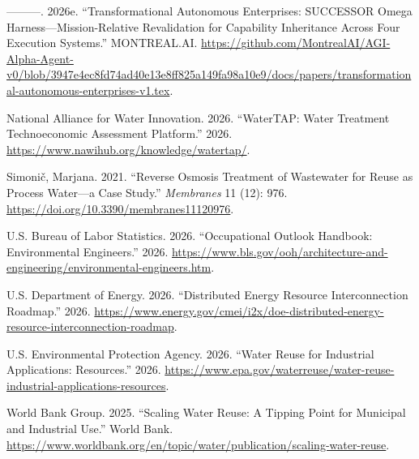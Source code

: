 \documentclass[
  11pt,
  letterpaper,
]{article}
\newlength{\cslhangindent}
\newlength{\cslentryspacingunit} %
\newenvironment{CSLReferences}[2] %
 {%
  \setlength{\parindent}{0pt}
  \ifodd #1
  \let\oldpar\par
  \def\par{\hangindent=\cslhangindent\oldpar}
  \fi
  \setlength{\parskip}{#2\cslentryspacingunit}
 }%
 {}
\begin{document}
\begin{CSLReferences}{1}{0}
\leavevmode{}%
---------. 2026e. {``Transformational Autonomous Enterprises: SUCCESSOR
Omega Harness---Mission-Relative Revalidation for Capability Inheritance
Across Four Execution Systems.''} MONTREAL.AI.
\url{https://github.com/MontrealAI/AGI-Alpha-Agent-v0/blob/3947e4ec8fd74ad40e13e8ff825a149fa98a10e9/docs/papers/transformational-autonomous-enterprises-v1.tex}.

\leavevmode{}%
National Alliance for Water Innovation. 2026. {``WaterTAP: Water
Treatment Technoeconomic Assessment Platform.''} 2026.
\url{https://www.nawihub.org/knowledge/watertap/}.

\leavevmode{}%
Simonič, Marjana. 2021. {``Reverse Osmosis Treatment of Wastewater for
Reuse as Process Water---a Case Study.''} \emph{Membranes} 11 (12): 976.
\url{https://doi.org/10.3390/membranes11120976}.

\leavevmode{}%
U.S. Bureau of Labor Statistics. 2026. {``Occupational Outlook Handbook:
Environmental Engineers.''} 2026.
\url{https://www.bls.gov/ooh/architecture-and-engineering/environmental-engineers.htm}.

\leavevmode{}%
U.S. Department of Energy. 2026. {``Distributed Energy Resource
Interconnection Roadmap.''} 2026.
\url{https://www.energy.gov/cmei/i2x/doe-distributed-energy-resource-interconnection-roadmap}.

\leavevmode{}%
U.S. Environmental Protection Agency. 2026. {``Water Reuse for
Industrial Applications: Resources.''} 2026.
\url{https://www.epa.gov/waterreuse/water-reuse-industrial-applications-resources}.

\leavevmode{}%
World Bank Group. 2025. {``Scaling Water Reuse: A Tipping Point for
Municipal and Industrial Use.''} World Bank.
\url{https://www.worldbank.org/en/topic/water/publication/scaling-water-reuse}.

\end{CSLReferences}
\end{document}
